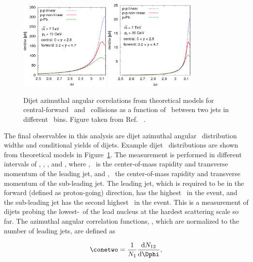 \begin{figure}
	\centering
	\includegraphics[width=0.40\textwidth]{figures/kutak0.png} 
	\includegraphics[width=0.40\textwidth]{figures/kutak1.png} 
	\caption{ Dijet azimuthal angular correlations from theoretical models for central-forward \pp\ and \pPb\ collisions as a function of \Dphi\ between two jets in different \pt\ bins. Figure taken from Ref. ~\cite{Kutak:2012rf}. }	
	\label{fig:kutakdphi}
\end{figure}

The final observables in this analysis are dijet azimuthal angular \Dphi\ distribution widths and conditional yields of dijets.  Example dijet \Dphi\ distributions are shown from theoretical models in Figure~\ref{fig:kutakdphi}. The measurement is performed in different intervals of \ystarone, \ystartwo, \ptone, and \pttwo, where \ystarone, \ptone\ is the center-of-mass rapidity and transverse momentum of the leading jet, and \ystartwo, \pttwo\ the  center-of-mass rapidity and transverse momentum of the sub-leading jet. The leading jet, which is required to be in the forward (defined as proton-going) direction, has the highest \pT\ in the event, and the sub-leading jet has the second highest \pT\ in the event. This is a measurement of dijets probing the lowest-\xb\ of the lead nucleus at the hardest scattering scale so far. The azimuthal angular correlation functions, \conetwo, which are normalized to the number of leading jets, are defined as

\begin{equation}
\conetwo=\frac{1}{N_{1}} \frac{\mathrm{d}N_{12}}{\mathrm{d}\Dphi},
\label{eqn:c12}
\end{equation}

